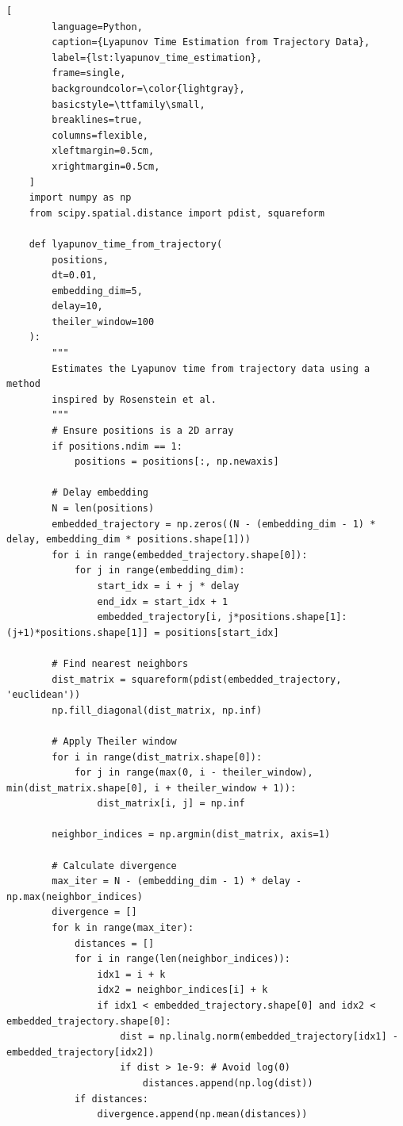 \documentclass{article}
\begin{document}
\begin{enumerate}
    \begin{lstlisting}[
        language=Python,
        caption={Lyapunov Time Estimation from Trajectory Data},
        label={lst:lyapunov_time_estimation},
        frame=single,
        backgroundcolor=\color{lightgray},
        basicstyle=\ttfamily\small,
        breaklines=true,
        columns=flexible,
        xleftmargin=0.5cm,
        xrightmargin=0.5cm,
    ]
    import numpy as np
    from scipy.spatial.distance import pdist, squareform

    def lyapunov_time_from_trajectory(
        positions,
        dt=0.01,
        embedding_dim=5,
        delay=10,
        theiler_window=100
    ):
        """
        Estimates the Lyapunov time from trajectory data using a method
        inspired by Rosenstein et al.
        """
        # Ensure positions is a 2D array
        if positions.ndim == 1:
            positions = positions[:, np.newaxis]

        # Delay embedding
        N = len(positions)
        embedded_trajectory = np.zeros((N - (embedding_dim - 1) * delay, embedding_dim * positions.shape[1]))
        for i in range(embedded_trajectory.shape[0]):
            for j in range(embedding_dim):
                start_idx = i + j * delay
                end_idx = start_idx + 1
                embedded_trajectory[i, j*positions.shape[1]:(j+1)*positions.shape[1]] = positions[start_idx]

        # Find nearest neighbors
        dist_matrix = squareform(pdist(embedded_trajectory, 'euclidean'))
        np.fill_diagonal(dist_matrix, np.inf)

        # Apply Theiler window
        for i in range(dist_matrix.shape[0]):
            for j in range(max(0, i - theiler_window), min(dist_matrix.shape[0], i + theiler_window + 1)):
                dist_matrix[i, j] = np.inf

        neighbor_indices = np.argmin(dist_matrix, axis=1)

        # Calculate divergence
        max_iter = N - (embedding_dim - 1) * delay - np.max(neighbor_indices)
        divergence = []
        for k in range(max_iter):
            distances = []
            for i in range(len(neighbor_indices)):
                idx1 = i + k
                idx2 = neighbor_indices[i] + k
                if idx1 < embedded_trajectory.shape[0] and idx2 < embedded_trajectory.shape[0]:
                    dist = np.linalg.norm(embedded_trajectory[idx1] - embedded_trajectory[idx2])
                    if dist > 1e-9: # Avoid log(0)
                        distances.append(np.log(dist))
            if distances:
                divergence.append(np.mean(distances))


\end{lstlisting}
\end{enumerate}
\end{document}

